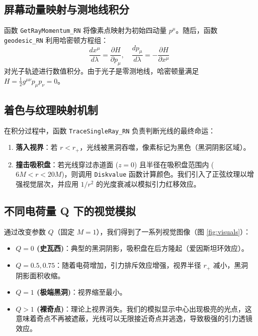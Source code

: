 \documentclass[a4paper,12pt]{article}
\begin{document}
\subsection{屏幕动量映射与测地线积分}
函数 \texttt{GetRayMomentum\_RN} 将像素点映射为初始四动量 $p^\mu$。随后，函数 \texttt{geodesic\_RN} 利用哈密顿方程组：
\begin{equation}
    \frac{dx^\mu}{d\lambda} = \frac{\partial H}{\partial p_\mu}, \quad \frac{dp_\mu}{d\lambda} = -\frac{\partial H}{\partial x^\mu}
\end{equation}
对光子轨迹进行数值积分。由于光子是零测地线，哈密顿量满足 $H = \frac{1}{2}g^{\mu\nu}p_\mu p_\nu = 0$。

\subsection{着色与纹理映射机制}
在积分过程中，函数 \texttt{TraceSingleRay\_RN} 负责判断光线的最终命运：
\begin{enumerate}
    \item \textbf{落入视界}：若 $r < r_+$，光线被黑洞吞噬，像素标记为黑色（黑洞阴影区域）。
    \item \textbf{撞击吸积盘}：若光线穿过赤道面 ($z=0$) 且半径在吸积盘范围内 ($6M < r < 20M$)，则调用 \texttt{Diskvalue} 函数计算颜色。我们引入了正弦纹理以增强视觉层次，并应用 $1/r^2$ 的光度衰减以模拟引力红移效应。
\end{enumerate}

\subsection{不同电荷量 Q 下的视觉模拟}
通过改变参数 $Q$（固定 $M=1$），我们得到了一系列视觉图像（图 \ref{fig:visuals}）：
\begin{itemize}
    \item \textbf{$Q=0$ (史瓦西)}：典型的黑洞阴影，吸积盘在后方隆起（爱因斯坦环效应）。
    \item \textbf{$Q=0.5, 0.75$}：随着电荷增加，引力排斥效应增强，视界半径 $r_+$ 减小，黑洞阴影面积收缩。
    \item \textbf{$Q=1$ (极端黑洞)}：视界缩至最小。
    \item \textbf{$Q>1$ (裸奇点)}：理论上视界消失。我们的模拟显示中心出现极亮的光点，这意味着奇点不再被遮蔽，光线可以无限接近奇点并逃逸，导致极强的引力透镜效应。
\end{itemize}
\end{document}
